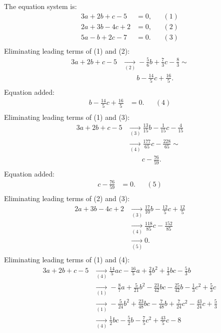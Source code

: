 {\scriptsize
The equation system is:
\begin{align*}
3a+2b+c-5&= 0, &&(1)\\
2a+3b-4c+2&= 0, &&(2)\\
5a-b+2c-7&= 0. &&(3)\\
\end{align*}
Eliminating leading terms of (1) and (2):
\begin{align*}
3a+2b+c-5&\underset{(2)}{\rightarrow}-\frac{5}{6}b+\frac{7}{3}c-\frac{8}{3}
\sim \\ &\qquad b-\frac{14}{5}c+\frac{16}{5}
.\\ \end{align*}
Equation added:
\begin{align*}
b-\frac{14}{5}c+\frac{16}{5}&= 0. &&(4)\\
\end{align*}
Eliminating leading terms of (1) and (3):
\begin{align*}
3a+2b+c-5&\underset{(3)}{\rightarrow}\frac{13}{15}b-\frac{1}{15}c-\frac{4}{15}
\\ &\underset{(4)}{\rightarrow}\frac{177}{65}c-\frac{228}{65}
\sim \\ &\qquad c-\frac{76}{59}
.\\ \end{align*}
Equation added:
\begin{align*}
c-\frac{76}{59}&= 0. &&(5)\\
\end{align*}
Eliminating leading terms of (2) and (3):
\begin{align*}
2a+3b-4c+2&\underset{(3)}{\rightarrow}\frac{17}{10}b-\frac{12}{5}c+\frac{12}{5}
\\ &\underset{(4)}{\rightarrow}\frac{118}{85}c-\frac{152}{85}
\\ &\underset{(5)}{\rightarrow}0
.\\ \end{align*}
Eliminating leading terms of (1) and (4):
\begin{align*}
3a+2b+c-5&\underset{(4)}{\rightarrow}\frac{14}{5}ac-\frac{16}{5}a+\frac{2}{3}b^{2}+\frac{1}{3}bc-\frac{5}{3}b
\\ &\underset{(1)}{\rightarrow}-\frac{8}{7}a+\frac{5}{21}b^{2}-\frac{23}{42}bc-\frac{25}{42}b-\frac{1}{3}c^{2}+\frac{5}{3}c
\\ &\underset{(1)}{\rightarrow}-\frac{5}{24}b^{2}+\frac{23}{48}bc-\frac{7}{48}b+\frac{7}{24}c^{2}-\frac{43}{24}c+\frac{5}{3}
\\ &\underset{(4)}{\rightarrow}\frac{1}{2}bc-\frac{5}{2}b-\frac{7}{5}c^{2}+\frac{43}{5}c-8

\end{align*}}
